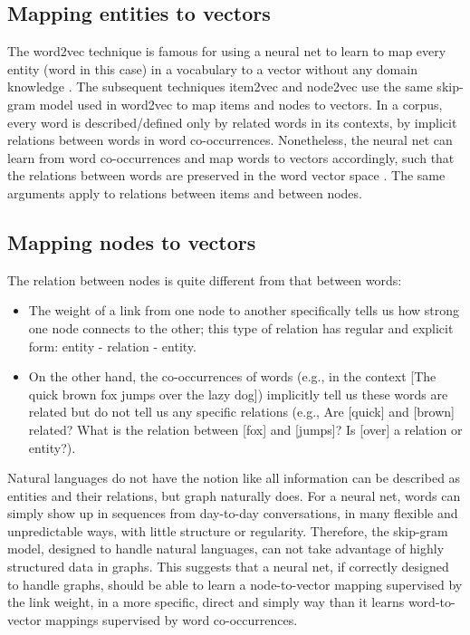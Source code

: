 \documentclass[conference]{IEEEtran}
\begin{document}
\subsection{Mapping entities to vectors}
The word2vec technique is famous for using a neural net to learn to map every 
entity (word in this case) in a vocabulary to a vector without any domain 
knowledge \cite{mikolov2013efficient}.
The subsequent techniques item2vec \cite{barkan2016item2vec}
and node2vec \cite{grovernode2vec} use the same skip-gram 
model used in word2vec to map items and nodes to vectors.
In a corpus, every word is described/defined only by related words in its 
contexts, by implicit relations between words in word co-occurrences.
Nonetheless, the neural net can learn from word co-occurrences and map words to 
vectors accordingly,
such that the relations between words are preserved in the word vector space 
\cite{mikolov2013distributed}.
The same arguments apply to relations between items and between nodes.

\subsection{Mapping nodes to vectors}
The relation between nodes is quite different from that between words:
\begin{itemize}
	\item The weight of a link from one node to another specifically tells us
	how strong one node connects to the other;
	this type of relation has regular and explicit form:
	entity - relation - entity.
	\item On the other hand, the co-occurrences of words 
	(e.g., in the context [The quick brown fox jumps over the lazy dog])
	implicitly tell us these words are related
	but do not tell us any specific relations
	(e.g., Are [quick] and [brown] related? What is the relation between [fox] and [jumps]? Is [over] a relation or entity?).
\end{itemize}
Natural languages do not have the notion like
all information can be described as entities and their relations,
but graph naturally does.
For a neural net, 
words can simply show up in sequences from day-to-day conversations,
in many flexible and unpredictable ways, with little structure or regularity.
Therefore, the skip-gram model, designed to handle natural languages,
can not take advantage of highly structured data in graphs.
This suggests that a neural net, if correctly designed to handle graphs,
should be able to learn a node-to-vector mapping supervised by the link weight,
in a more specific, direct and simply way than it learns word-to-vector 
mappings supervised by word co-occurrences.
\end{document}
